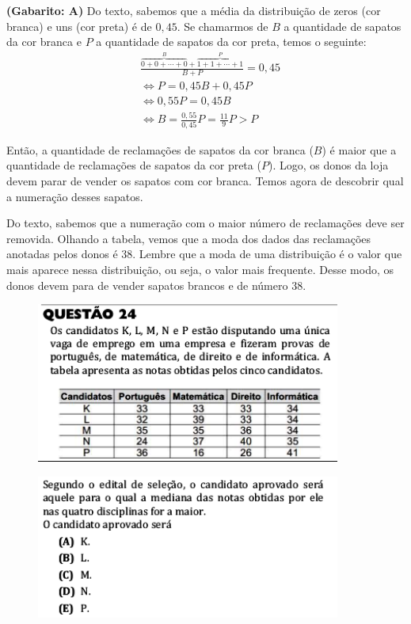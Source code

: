 \documentclass[a4paper]{article}
\begin{document}
\par\textbf{(Gabarito: A)} Do texto, sabemos que a média da distribuição de zeros (cor branca) e uns (cor preta) é de $0,45$. Se chamarmos de $B$ a quantidade de sapatos da cor branca e $P$ a quantidade de sapatos da cor preta, temos o seguinte:
\begin{align*}
&\frac{ \overbrace{0+0+\cdots+0}^{B} + \overbrace{1+1+\cdots+1}^{P}}{B+P} = 0,45 \\
&\iff  P = 0,45B + 0,45P \\ 
&\iff 0,55P = 0,45B \\
&\iff B = \frac{0,55}{0,45}P = \frac{11}{9}P > P
\end{align*}
\par\vspace{0.3cm} Então, a quantidade de reclamações de sapatos da cor branca ($B$) é maior que a quantidade de reclamações de sapatos da cor preta ($P$). Logo, os donos da loja devem parar de vender os sapatos com cor branca. Temos agora de descobrir qual a numeração desses sapatos.
\par\vspace{0.3cm} Do texto, sabemos que a numeração com o maior número de reclamações deve ser removida. Olhando a tabela, vemos que a moda dos dados das reclamações anotadas pelos donos é $38$. Lembre que a moda de uma distribuição é o valor que mais aparece nessa distribuição, ou seja, o valor mais frequente. Desse modo, os donos devem para de vender sapatos brancos e de número $38$.
\begin{figure}[H]
	\begin{center}
		\includegraphics[width=10cm]{L1Q24_1.png}
	\end{center}
\end{figure}
\begin{figure}[H]
	\begin{center}
		\includegraphics[width=10cm]{L1Q24_2.png}
	\end{center}
\end{figure}
\end{document}
